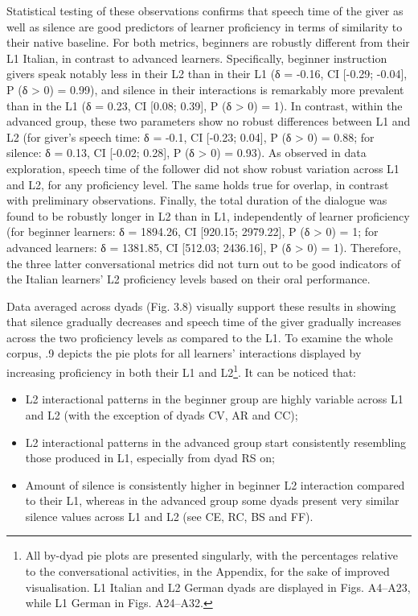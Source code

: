 Statistical testing of these observations confirms that speech time of the giver as well as silence are good predictors of learner proficiency in terms of similarity to their native baseline. For both metrics, beginners are robustly different from their L1 Italian, in contrast to advanced learners. Specifically, beginner instruction givers speak notably less in their L2 than in their L1 (δ = -0.16, CI [-0.29; -0.04], P (δ > 0) = 0.99), and silence in their interactions is remarkably more prevalent than in the L1 (δ = 0.23, CI [0.08; 0.39], P (δ > 0) = 1). In contrast, within the advanced group, these two parameters show no robust differences between L1 and L2 (for giver’s speech time: δ = -0.1, CI [-0.23; 0.04], P (δ > 0) = 0.88; for silence: δ = 0.13, CI [-0.02; 0.28], P (δ > 0) = 0.93). As observed in data exploration, speech time of the follower did not show robust variation across L1 and L2, for any proficiency level. The same holds true for overlap, in contrast with preliminary observations. Finally, the total duration of the dialogue was found to be robustly longer in L2 than in L1, independently of learner proficiency (for beginner learners: δ = 1894.26, CI [920.15; 2979.22], P (δ > 0) = 1; for advanced learners: δ = 1381.85, CI [512.03; 2436.16], P (δ > 0) = 1). Therefore, the three latter conversational metrics did not turn out to be good indicators of the Italian learners’ L2 proficiency levels based on their oral performance.

Data averaged across dyads (Fig. 3.8) visually support these results in showing that silence gradually decreases and speech time of the giver gradually increases across the two proficiency levels as compared to the L1. To examine the whole corpus, .9 depicts the pie plots for all learners’ interactions displayed by increasing proficiency in both their L1 and L2\footnote{All by-dyad pie plots are presented singularly, with the percentages relative to the conversational activities, in the Appendix, for the sake of improved visualisation. L1 Italian and L2 German dyads are displayed in Figs. A4–A23, while L1 German in Figs. A24–A32.}. It can be noticed that:

\begin{itemize}
\item L2 interactional patterns in the beginner group are highly variable across L1 and L2 (with the exception of dyads CV, AR and CC);
\item L2 interactional patterns in the advanced group start consistently resembling those produced in L1, especially from dyad RS on;
\item Amount of silence is consistently higher in beginner L2 interaction compared to their L1, whereas in the advanced group some dyads present very similar silence values across L1 and L2 (see CE, RC, BS and FF).
\end{itemize}

